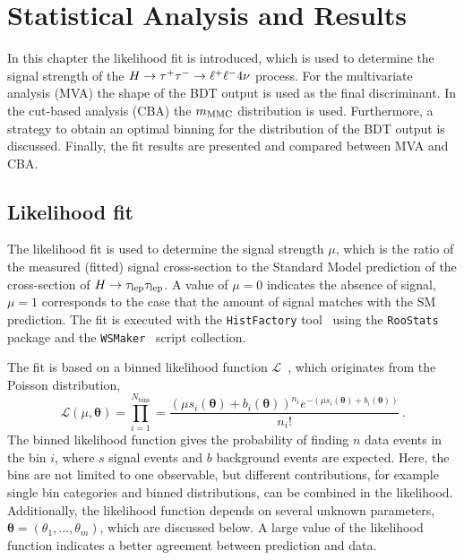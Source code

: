 \chapter{Statistical Analysis and Results}\label{cha:fit}

In this chapter the likelihood fit is introduced, which is used to determine the signal strength of the $H \to \tau^+\tau^- \to \ell^+\ell^- 4\nu$ process.
For the multivariate analysis (MVA) the shape of the BDT output is used as the final discriminant.
In the cut-based analysis (CBA) the $m_\text{MMC}$ distribution is used.
Furthermore, a strategy to obtain an optimal binning for the distribution of the BDT output is discussed.
Finally, the fit results are presented and compared between MVA and CBA\@.

\section{Likelihood fit}

The likelihood fit is used to determine the signal strength $\mu$, which is the ratio of the measured (fitted) signal cross-section to the
Standard Model prediction of the cross-section of $H \to \tau_\text{lep} \tau_\text{lep}$.
A value of $\mu = 0$ indicates the absence of signal, $\mu = 1$ corresponds to the case that the amount of signal matches with the SM prediction.
The fit is executed with the \texttt{HistFactory} tool~\cite{HistFactory} using the \texttt{RooStats}~\cite{RooStats} package and the \texttt{WSMaker}~\cite{WSMaker} script collection.

The fit is based on a binned likelihood function $\mathcal{L}$~\cite{FitATLAS}, which originates from the Poisson distribution,
\begin{equation}
    \mathcal{L}(\mu, \bm{\theta}) = \prod_{i=1}^{N_\text{bins}} = \frac{{\left(\mu s_i (\bm{\theta}) + b_i(\bm{\theta})\right)}^{n_i} e^{-(\mu s_i (\bm{\theta}) + b_i(\bm{\theta}))}}{n_i!} \,.
\end{equation}
The binned likelihood function gives the probability of finding $n$ data events in the bin $i$, where $s$ signal events and $b$ background events are expected.
Here, the bins are not limited to one observable, but different contributions, for example single bin categories and binned distributions, can be combined in the likelihood.
Additionally, the likelihood function depends on several unknown parameters, $\bm{\theta} = (\theta_1, \ldots, \theta_m)$, which are discussed below.
A large value of the likelihood function indicates a better agreement between prediction and data.

